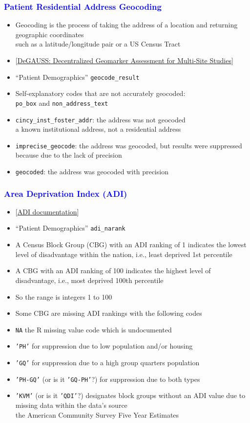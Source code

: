 \documentclass[11pt,pdftex,dvipsnames,usenames]{beamer}
\begin{document}
\begin{frame}[fragile]\frametitle{\bf\textcolor{blue}{Patient Residential
Address Geocoding}}
\begin{itemize}
\item Geocoding is the process of taking the address of a location and
  returning geographic coordinates\\
 such as a latitude/longitude pair or a US Census Tract
\item  
\textcolor{PineGreen}{[\href{https://degauss.org}{DeGAUSS:
    Decentralized Geomarker Assessment for Multi-Site Studies}]}
\item ``Patient Demographics'' \texttt{geocode\_result}
\item Self-explanatory codes that are not accurately geocoded:\\ 
\texttt{po\_box} and \texttt{non\_address\_text} 
\item \texttt{cincy\_inst\_foster\_addr}: the address was not geocoded \\ 
a known institutional address, not a residential address
\item \texttt{imprecise\_geocode}: the address was geocoded, but results were suppressed because due to the lack of precision
\item \texttt{geocoded}: the address was geocoded with precision
\end{itemize}
\end{frame}

\begin{frame}[fragile]\frametitle{\bf\textcolor{blue}{Area Deprivation Index (ADI)}}
\begin{itemize}
\item \textcolor{PineGreen}{[\href{https://www.neighborhoodatlas.medicine.wisc.edu}{ADI documentation}]}
\item ``Patient Demographics'' \texttt{adi\_narank}
\item A Census Block Group (CBG) with an ADI ranking of 1 indicates the lowest level of disadvantage within the nation, i.e., least deprived 1st percentile
\item A CBG with an ADI ranking of 100 indicates the highest level of disadvantage, i.e., most deprived 100th percentile
\item So the range is integers 1 to 100
\item Some CBG are missing ADI rankings with the following codes
\item \texttt{NA} the R missing value code which is undocumented
\item \texttt{'PH'} for suppression due to low population and/or housing 
\item \texttt{'GQ'} for suppression due to a high group quarters population
\item \texttt{'PH-GQ'}  (or is it \texttt{'GQ-PH'}?) 
for suppression due to both types
\item \texttt{'KVM'} (or is it \texttt{'QDI'}?) 
designates block groups without an ADI value due to 
  missing data within the data's source\\
the American Community Survey Five Year Estimates
\end{itemize}
\end{frame}
\end{document}
